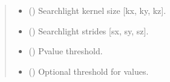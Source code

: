 \documentclass[letterpaper,10pt,english]{sphinxhowto}
\begin{document}
\begin{fulllineitems}
\begin{quote}
\begin{description}
\begin{itemize}
\item {} 
\sphinxAtStartPar
{} (\sphinxstyleliteralemphasis{\sphinxupquote{, }}\sphinxstyleliteralemphasis{\sphinxupquote{(}}\sphinxstyleliteralemphasis{\sphinxupquote{, }}\sphinxstyleliteralemphasis{\sphinxupquote{, }}\sphinxstyleliteralemphasis{\sphinxupquote{)}}) \textendash{} Searchlight kernel size {[}kx, ky, kz{]}.

\item {} 
\sphinxAtStartPar
{} (\sphinxstyleliteralemphasis{\sphinxupquote{, }}\sphinxstyleliteralemphasis{\sphinxupquote{(}}\sphinxstyleliteralemphasis{\sphinxupquote{, }}\sphinxstyleliteralemphasis{\sphinxupquote{, }}\sphinxstyleliteralemphasis{\sphinxupquote{)}}) \textendash{} Searchlight strides {[}sx, sy, sz{]}.

\item {} 
\sphinxAtStartPar
{} (\sphinxstyleliteralemphasis{\sphinxupquote{, }}) \textendash{} P\sphinxhyphen{}value threshold.

\item {} 
\sphinxAtStartPar
{} (\sphinxstyleliteralemphasis{\sphinxupquote{, }}) \textendash{} 
\sphinxAtStartPar
Optional threshold for values.


\end{itemize}
\end{description}
\end{quote}
\end{fulllineitems}
\end{document}
